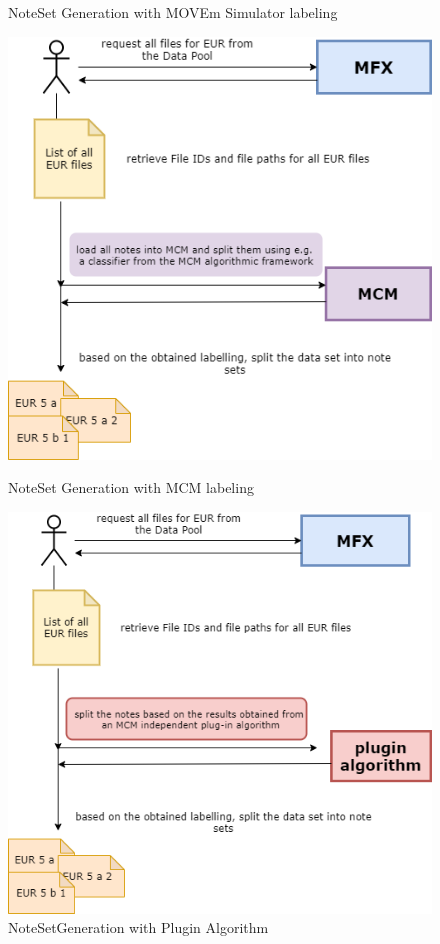 \begin{figure}[!htb]
  \caption{NoteSet Generation with MOVEm Simulator labeling}\label{fig:ns_sim}
\endminipage\hfill
{}
  \includegraphics[width=\linewidth]{images/label_mcm_approach.png}
  \caption{NoteSet Generation with MCM labeling}\label{fig:ns_mcm}
\endminipage\hfill
{}%
  \includegraphics[width=\linewidth]{images/label_plugin_approach.png}
  \caption{NoteSetGeneration with Plugin Algorithm}\label{fig:ns_plugin}
\endminipage
\end{figure}

